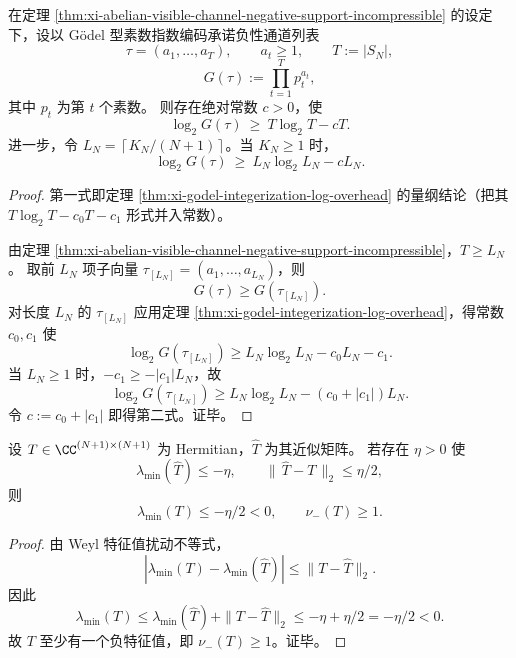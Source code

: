 \begin{theorem}\label{thm:xi-godel-encoding-implementation-cost-for-negative-ledger}
在定理 \ref{thm:xi-abelian-visible-channel-negative-support-incompressible} 的设定下，设以 Gödel 型素数指数编码承诺负性通道列表
\[
\tau=(a_1,\dots,a_T),\qquad a_t\ge 1,\qquad T:=|S_N|,
\]
\[
G(\tau):=\prod_{t=1}^{T}p_t^{a_t},
\]
其中 \(p_t\) 为第 \(t\) 个素数。
则存在绝对常数 \(c>0\)，使
\[
\log_2 G(\tau)\ \ge\ T\log_2 T-cT.
\]
进一步，令 \(L_N=\left\lceil K_N/(N+1)\right\rceil\)。当 \(K_N\ge 1\) 时，
\[
\log_2 G(\tau)\ \ge\ L_N\log_2 L_N-cL_N.
\]
\end{theorem}
\begin{proof}
第一式即定理 \ref{thm:xi-godel-integerization-log-overhead} 的量纲结论（把其 \(T\log_2T-c_0T-c_1\) 形式并入常数）。
\par
由定理 \ref{thm:xi-abelian-visible-channel-negative-support-incompressible}，\(T\ge L_N\)。
取前 \(L_N\) 项子向量 \(\tau_{[L_N]}=(a_1,\dots,a_{L_N})\)，则
\[
G(\tau)\ge G(\tau_{[L_N]}).
\]
对长度 \(L_N\) 的 \(\tau_{[L_N]}\) 应用定理 \ref{thm:xi-godel-integerization-log-overhead}，得常数 \(c_0,c_1\) 使
\[
\log_2 G(\tau_{[L_N]})
\ge L_N\log_2L_N-c_0L_N-c_1.
\]
当 \(L_N\ge 1\) 时，\(-c_1\ge-|c_1|L_N\)，故
\[
\log_2 G(\tau_{[L_N]})
\ge L_N\log_2L_N-(c_0+|c_1|)L_N.
\]
令 \(c:=c_0+|c_1|\) 即得第二式。证毕。
\end{proof}

\begin{proposition}\label{prop:xi-toeplitz-negative-spectrum-robust-verification}
设 \(T\in\CC^{(N+1)\times(N+1)}\) 为 Hermitian，\(\widehat T\) 为其近似矩阵。
若存在 \(\eta>0\) 使
\[
\lambda_{\min}(\widehat T)\le -\eta,\qquad
\|\,\widehat T-T\,\|_2\le \eta/2,
\]
则
\[
\lambda_{\min}(T)\le -\eta/2<0,
\qquad
\nu_-(T)\ge 1.
\]
\end{proposition}
\begin{proof}
由 Weyl 特征值扰动不等式，
\[
|\lambda_{\min}(T)-\lambda_{\min}(\widehat T)|
\le \|T-\widehat T\|_2.
\]
因此
\[
\lambda_{\min}(T)
\le \lambda_{\min}(\widehat T)+\|T-\widehat T\|_2
\le -\eta+\eta/2=-\eta/2<0.
\]
故 \(T\) 至少有一个负特征值，即 \(\nu_-(T)\ge 1\)。证毕。
\end{proof}

